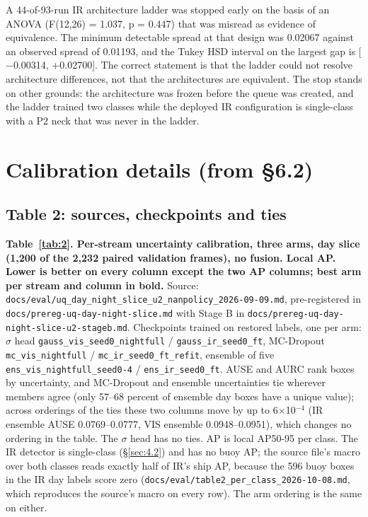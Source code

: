 \documentclass[10pt]{article}
\begin{document}
A 44-of-93-run IR architecture ladder was stopped early on the basis of an ANOVA (F(12,26) = 1.037, p = 0.447) that was misread as evidence of equivalence. The minimum detectable spread at that design was 0.02067 against an observed spread of 0.01193, and the Tukey HSD interval on the largest gap is [$-$0.00314, +0.02700]. The correct statement is that the ladder could not resolve architecture differences, not that the architectures are equivalent. The stop stands on other grounds: the architecture was frozen before the queue was created, and the ladder trained two classes while the deployed IR configuration is single-class with a P2 neck that was never in the ladder.

\FloatBarrier
\section{Calibration details (from \S6.2)}\label{app:F}
\subsection{Table 2: sources, checkpoints and ties}\label{app:F.1}
\textbf{Table~\ref{tab:2}. Per-stream uncertainty calibration, three arms, day slice (1,200 of the 2,232 paired validation frames), no fusion. Local AP. Lower is better on every column except the two AP columns; best arm per stream and column in bold.} Source: \texttt{docs/\allowbreak{}eval/\allowbreak{}uq\_\allowbreak{}day\_\allowbreak{}night\_\allowbreak{}slice\_\allowbreak{}u2\_\allowbreak{}nanpolicy\_\allowbreak{}2026-09-09.md}, pre-registered in \texttt{docs/\allowbreak{}prereg-uq-day-night-slice.md} with Stage B in \texttt{docs/\allowbreak{}prereg-uq-day-night-slice-u2-stageb.md}. Checkpoints trained on restored labels, one per arm: $\sigma$ head \texttt{gauss\_\allowbreak{}vis\_\allowbreak{}seed0\_\allowbreak{}nightfull} / \texttt{gauss\_\allowbreak{}ir\_\allowbreak{}seed0\_\allowbreak{}ft}, MC-Dropout \texttt{mc\_\allowbreak{}vis\_\allowbreak{}nightfull} / \texttt{mc\_\allowbreak{}ir\_\allowbreak{}seed0\_\allowbreak{}ft\_\allowbreak{}refit}, ensemble of five \texttt{ens\_\allowbreak{}vis\_\allowbreak{}nightfull\_\allowbreak{}seed0-4} / \texttt{ens\_\allowbreak{}ir\_\allowbreak{}seed0\_\allowbreak{}ft}. AUSE and AURC rank boxes by uncertainty, and MC-Dropout and ensemble uncertainties tie wherever members agree (only 57--68 percent of ensemble day boxes have a unique value); across orderings of the ties these two columns move by up to 6$\times$10$^{-4}$ (IR ensemble AUSE 0.0769--0.0777, VIS ensemble 0.0948--0.0951), which changes no ordering in the table. The $\sigma$ head has no ties. AP is local AP50-95 per class. The IR detector is single-class (\S\ref{sec:4.2}) and has no buoy AP; the source file's macro over both classes reads exactly half of IR's ship AP, because the 596 buoy boxes in the IR day labels score zero (\texttt{docs/\allowbreak{}eval/\allowbreak{}table2\_\allowbreak{}per\_\allowbreak{}class\_\allowbreak{}2026-10-08.md}, which reproduces the source's macro on every row). The arm ordering is the same on either.
\end{document}
